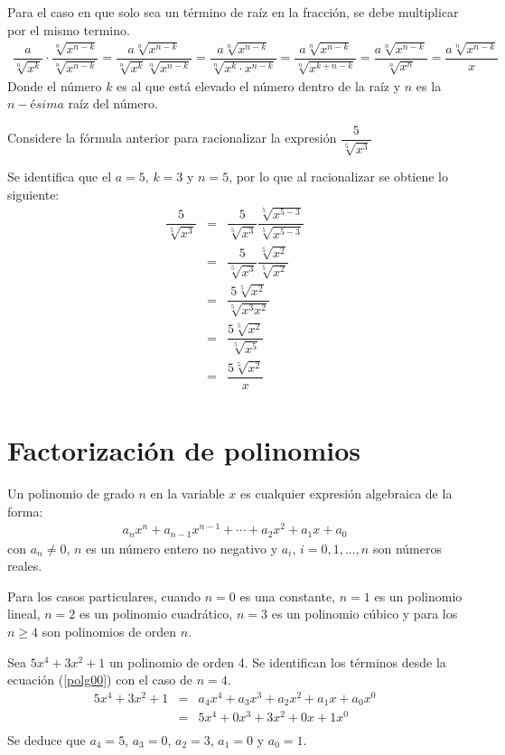 Para el caso en que solo sea un término de raíz en la fracción, se debe multiplicar por el mismo termino.
\begin{eqnarray}
\dfrac{a}{\sqrt[n]{x^{k}}}\cdot\dfrac{\sqrt[n]{x^{n-k}}}{\sqrt[n]{x^{n-k}}}=\dfrac{a\sqrt[n]{x^{n-k}}}{\sqrt[n]{x^{k}}\sqrt[n]{x^{n-k}}}=\dfrac{a\sqrt[n]{x^{n-k}}}{\sqrt[n]{x^{k}\cdot x^{n-k}}}=\dfrac{a\sqrt[n]{x^{n-k}}}{\sqrt[n]{x^{k+n-k}}}=\dfrac{a\sqrt[n]{x^{n-k}}}{\sqrt[n]{x^{n}}}=\dfrac{a\sqrt[n]{x^{n-k}}}{x}
\end{eqnarray} 
Donde el número $k$ es al que está elevado el número dentro de la raíz y $n$ es la $n-$é$sima$ raíz del número.

\begin{myexample}
Considere la fórmula anterior para racionalizar la expresión $\dfrac{5}{\sqrt[5]{x^{3}}}$
\end{myexample}
Se identifica que el $a=5$, $k=3$ y $n=5$, por lo que al racionalizar se obtiene lo siguiente:
\begin{eqnarray*}
\dfrac{5}{\sqrt[5]{x^{3}}}&=& \dfrac{5}{\sqrt[5]{x^{3}}}\dfrac{\sqrt[5]{x^{5-3}}}{\sqrt[5]{x^{5-3}}}\nonumber\\
&=& \dfrac{5}{\sqrt[5]{x^{3}}}\dfrac{\sqrt[5]{x^{2}}}{\sqrt[5]{x^{2}}}\nonumber\\
&=& \dfrac{5\sqrt[5]{x^{2}}}{\sqrt[5]{x^{3}x^{2}}}\nonumber\\
&=& \dfrac{5\sqrt[5]{x^{2}}}{\sqrt[5]{x^{5}}}\nonumber\\
&=& \dfrac{5\sqrt[5]{x^{2}}}{x}\nonumber\\
\end{eqnarray*}

\section{Factorización de polinomios}

\begin{mydef}
Un polinomio de grado $n$ en la variable $x$ es cualquier expresión algebraica de la forma:
\begin{eqnarray}
a_{n}x^{n}+a_{n-1}x^{n-1}+\cdots +a_{2}x^{2}+a_{1}x+a_{0}
\label{polg00}
\end{eqnarray}
con $a_{n}\neq 0$, $n$ es un número entero no negativo y $a_{i}$, $i=0,1,...,n$ son números reales.
\end{mydef}
Para los casos particulares, cuando $n=0$ es una constante, $n=1$ es un polinomio lineal, $n=2$ es un polinomio cuadrático, $n=3$ es un polinomio cúbico y para los $n\geq 4$ son polinomios de orden $n$.\\
\begin{myexample}
Sea  $5x^{4}+3x^{2}+1$ un polinomio de orden 4. Se identifican los términos desde la ecuación (\ref{polg00}) con el caso de $n=4$.
\begin{eqnarray*}
5x^{4}+3x^{2}+1&=& a_{4}x^{4}+a_{3}x^{3}+a_{2}x^{2}+a_{1}x+a_{0}x^{0}\\
&=& 5x^{4}+0x^{3}+3x^{2}+0x+1x^{0}\\
\end{eqnarray*}
Se deduce que $a_{4}=5$, $a_{3}=0$, $a_{2}=3$, $a_{1}=0$ y $a_{0}=1$.
\end{myexample}

